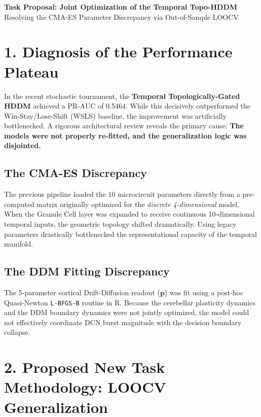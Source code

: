 \documentclass[11pt,a4paper]{article}
\begin{document}
\begin{center}
    \LARGE \textbf{Task Proposal: Joint Optimization of the Temporal Topo-HDDM} \\[0.5em]
    \large Resolving the CMA-ES Parameter Discrepancy via Out-of-Sample LOOCV
\end{center}

\vspace{1em}

\section{1. Diagnosis of the Performance Plateau}

In the recent stochastic tournament, the \textbf{Temporal Topologically-Gated HDDM} achieved a PR-AUC of 0.5464. While this decisively outperformed the Win-Stay/Lose-Shift (WSLS) baseline, the improvement was artificially bottlenecked. A rigorous architectural review reveals the primary cause: \textbf{The models were not properly re-fitted, and the generalization logic was disjointed.}

\subsection{The CMA-ES Discrepancy}
The previous pipeline loaded the 10 microcircuit parameters directly from a pre-computed matrix originally optimized for the \textit{discrete 4-dimensional} model. When the Granule Cell layer was expanded to receive continuous 10-dimensional temporal inputs, the geometric topology shifted dramatically. Using legacy parameters drastically bottlenecked the representational capacity of the temporal manifold.

\subsection{The DDM Fitting Discrepancy}
The 5-parameter cortical Drift-Diffusion readout ($\mathbf{p}$) was fit using a post-hoc Quasi-Newton \texttt{L-BFGS-B} routine in R. Because the cerebellar plasticity dynamics and the DDM boundary dynamics were not jointly optimized, the model could not effectively coordinate DCN burst magnitude with the decision boundary collapse.

\section{2. Proposed New Task Methodology: LOOCV Generalization}
\end{document}
